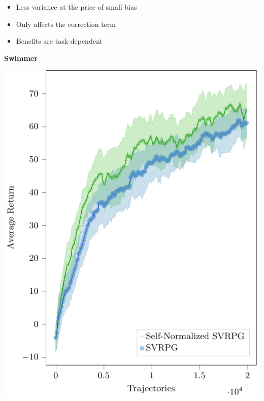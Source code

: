 \documentclass[aspectratio=169]{beamer}
\begin{document}
\begin{frame}
\begin{minipage}[]{.45\paperwidth}
\begin{itemize}
	\item Less variance at the price of small bias
	\item Only affects the correction term
	\item Benefits are task-dependent
\end{itemize}
\end{minipage}
\hfill%
\begin{minipage}[]{.35\paperwidth}
	\begin{center}
		\textbf{Swimmer}
	\end{center}
	\vspace*{-.25cm}
	\includegraphics[width=\textwidth]{images/normalization.pdf}
\end{minipage}

\end{frame}
\end{document}
